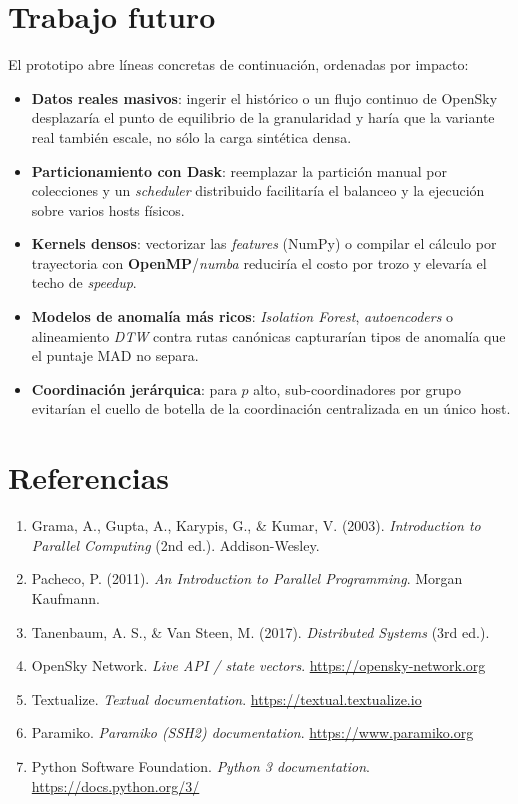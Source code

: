 \documentclass[letterpaper,11pt]{article}
\begin{document}
\section{Trabajo futuro}\label{sec:futuro}
El prototipo abre líneas concretas de continuación, ordenadas por impacto:
\begin{itemize}[nosep,leftmargin=1.3em]
  \item \textbf{Datos reales masivos}: ingerir el histórico o un flujo continuo de OpenSky desplazaría el
        punto de equilibrio de la granularidad y haría que la variante real también escale, no sólo la
        carga sintética densa.
  \item \textbf{Particionamiento con Dask}: reemplazar la partición manual por colecciones y un
        \emph{scheduler} distribuido facilitaría el balanceo y la ejecución sobre varios hosts físicos.
  \item \textbf{Kernels densos}: vectorizar las \emph{features} (NumPy) o compilar el cálculo por
        trayectoria con \textbf{OpenMP}/\emph{numba} reduciría el costo por trozo y elevaría el techo de
        \emph{speedup}.
  \item \textbf{Modelos de anomalía más ricos}: \emph{Isolation Forest}, \emph{autoencoders} o alineamiento
        \emph{DTW} contra rutas canónicas capturarían tipos de anomalía que el puntaje MAD no separa.
  \item \textbf{Coordinación jerárquica}: para $p$ alto, sub-coordinadores por grupo evitarían el cuello de
        botella de la coordinación centralizada en un único host.
\end{itemize}

\section*{Referencias}
\begin{enumerate}[nosep,leftmargin=1.6em]
  \item Grama, A., Gupta, A., Karypis, G., \& Kumar, V. (2003). \textit{Introduction to Parallel Computing} (2nd ed.). Addison-Wesley.
  \item Pacheco, P. (2011). \textit{An Introduction to Parallel Programming}. Morgan Kaufmann.
  \item Tanenbaum, A. S., \& Van Steen, M. (2017). \textit{Distributed Systems} (3rd ed.).
  \item OpenSky Network. \textit{Live API / state vectors}. \url{https://opensky-network.org}
  \item Textualize. \textit{Textual documentation}. \url{https://textual.textualize.io}
  \item Paramiko. \textit{Paramiko (SSH2) documentation}. \url{https://www.paramiko.org}
  \item Python Software Foundation. \textit{Python 3 documentation}. \url{https://docs.python.org/3/}
\end{enumerate}
\end{document}
